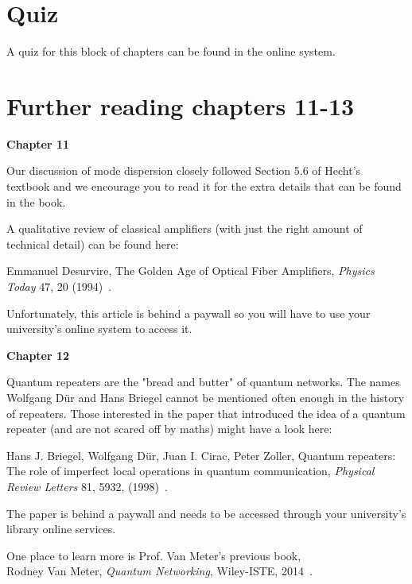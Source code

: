\newpage
\section*{Quiz}
A quiz for this block of chapters can be found in the online system.


\section*{Further reading chapters 11-13}

{\bf Chapter 11}

Our discussion of mode dispersion closely followed Section 5.6 of Hecht’s textbook and we encourage you to read it for the extra details that can be found in the book.

A qualitative review of classical amplifiers (with just the right amount of technical detail) can be found here:

Emmanuel Desurvire, The Golden Age of Optical Fiber Amplifiers, \emph{Physics Today} 47, 20 (1994)~\cite{desurvire1994golden}.

Unfortunately, this article is behind a paywall so you will have to use your university’s online system to access it.

{\bf Chapter 12}

Quantum repeaters are the "bread and butter" of quantum networks. The names Wolfgang D\"ur and Hans Briegel cannot be mentioned often enough in the history of repeaters. Those interested in the paper that introduced the idea of a quantum repeater (and are not scared off by maths) might have a look here:

Hans J. Briegel, Wolfgang Dür, Juan I. Cirac, Peter Zoller, Quantum repeaters: The role of imperfect local operations in quantum communication, \emph{Physical Review Letters} 81, 5932, (1998)~\cite{briegel98:_quant_repeater}.

The paper is behind a paywall and needs to be accessed through your university’s library online services.

One place to learn more is Prof. Van Meter's previous book,\\
Rodney Van Meter, \emph{Quantum Networking}, Wiley-ISTE, 2014~\cite{van-meter14:_quantum_networking}.



